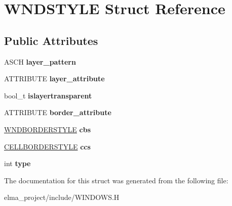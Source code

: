 \hypertarget{struct_w_n_d_s_t_y_l_e}{}\section{W\+N\+D\+S\+T\+Y\+LE Struct Reference}
\label{struct_w_n_d_s_t_y_l_e}
\subsection*{Public Attributes}
\begin{DoxyCompactItemize}
\item 
\mbox{\label{struct_w_n_d_s_t_y_l_e_abf552f42d73a2326256f4e76c6da3637}} 
A\+S\+CH {\bfseries layer\+\_\+pattern}
\item 
\mbox{\label{struct_w_n_d_s_t_y_l_e_a7d29cbfdba78f5cd41099effaefdcec9}} 
A\+T\+T\+R\+I\+B\+U\+TE {\bfseries layer\+\_\+attribute}
\item 
\mbox{\label{struct_w_n_d_s_t_y_l_e_a973c79b10c7e11e07f9b7ead0d23d8cb}} 
bool\+\_\+t {\bfseries islayertransparent}
\item 
\mbox{\label{struct_w_n_d_s_t_y_l_e_ab4b0a990ac8dd1d32a130ddf13ad0156}} 
A\+T\+T\+R\+I\+B\+U\+TE {\bfseries border\+\_\+attribute}
\item 
\mbox{\label{struct_w_n_d_s_t_y_l_e_a4f78d7ca54cab9f8dc31c4cea56a9866}} 
\mbox{\hyperlink{struct_w_n_d_b_o_r_d_e_r_s_t_y_l_e}{W\+N\+D\+B\+O\+R\+D\+E\+R\+S\+T\+Y\+LE}} {\bfseries cbs}
\item 
\mbox{\label{struct_w_n_d_s_t_y_l_e_a6751bf0d17238539cf561676088ee684}} 
\mbox{\hyperlink{struct_c_e_l_l_b_o_r_d_e_r_s_t_y_l_e}{C\+E\+L\+L\+B\+O\+R\+D\+E\+R\+S\+T\+Y\+LE}} {\bfseries ccs}
\item 
\mbox{\label{struct_w_n_d_s_t_y_l_e_a10cafd9a5fa0ae41ed6467dbfdc99387}} 
int {\bfseries type}
\end{DoxyCompactItemize}


The documentation for this struct was generated from the following file\+:\begin{DoxyCompactItemize}
\item 
elma\+\_\+project/include/W\+I\+N\+D\+O\+W\+S.\+H\end{DoxyCompactItemize}
